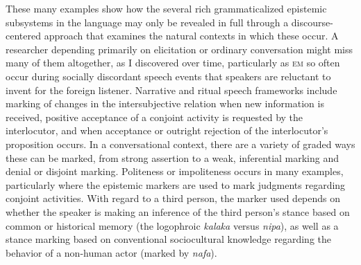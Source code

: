 \documentclass[output=paper]{langsci/langscibook}
\begin{document}
These many examples show how the several rich grammaticalized epistemic subsystems in the language may only be revealed in full through a discourse-centered approach that examines the natural contexts in which these occur.  A researcher depending primarily on elicitation or ordinary conversation might miss many of them altogether, as I discovered over time,  particularly as \textsc{em} so often occur during socially discordant speech events that speakers are reluctant to invent for the foreign listener. 
Narrative and ritual speech frameworks include marking of changes in the intersubjective relation when new information is received, positive acceptance of a conjoint activity is requested by the interlocutor, and when acceptance or outright rejection of the interlocutor’s proposition occurs.  In a conversational context, there are a variety of graded ways these can be marked, from strong assertion to a weak, inferential marking and denial or disjoint marking.  Politeness or impoliteness occurs in many examples, particularly where the epistemic markers are used to mark judgments regarding conjoint activities.   With regard to a third person, the marker used depends on whether the speaker is making an inference of the third person’s stance based on common or historical memory (the logophroic \textit{kalaka} versus \textit{nipa}), as well as a stance marking based on conventional sociocultural knowledge regarding the behavior of a non-human actor (marked by \textit{nafa}).  
\end{document}
